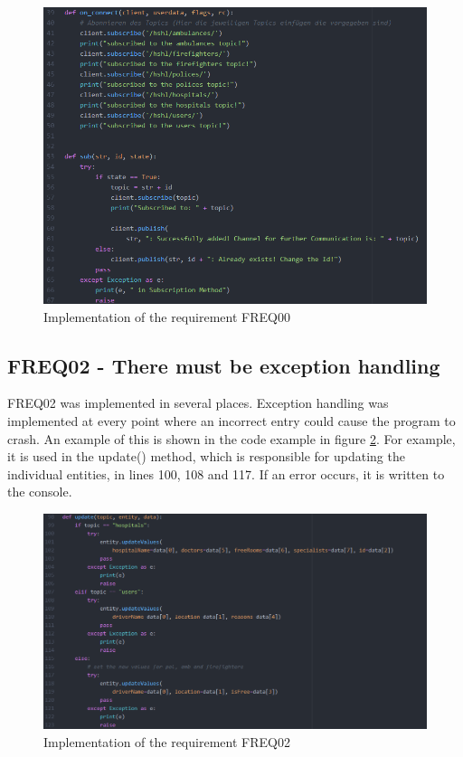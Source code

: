 \begin{figure}
\sidecaption
\includegraphics[scale=0.4]{images/walter/code/FREQ00.png}
\caption{Implementation of the requirement FREQ00}
\label{FREQ00}
\end{figure}

\subsection{FREQ02 - There must be exception handling}
FREQ02 was implemented in several places. Exception handling was implemented at every point where an incorrect entry could cause the program to crash. An example of this is shown in the code example in figure \ref{FREQ02}. For example, it is used in the update() method, which is responsible for updating the individual entities, in lines 100, 108 and 117. If an error occurs, it is written to the console.

\begin{figure}
\sidecaption
\includegraphics[scale=0.4]{images/walter/code/FREQ02-01.png}
\caption{Implementation of the requirement FREQ02}
\label{FREQ02}
\end{figure}

